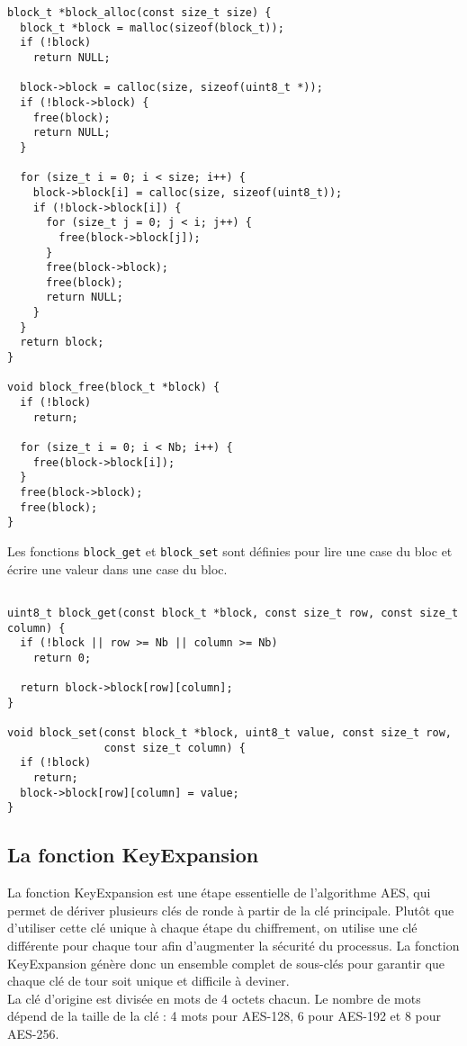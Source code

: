 \documentclass[a4paper, 10pt]{article}
\begin{document}
  \small{
  \begin{verbatim}  
block_t *block_alloc(const size_t size) {
  block_t *block = malloc(sizeof(block_t));
  if (!block)
    return NULL;

  block->block = calloc(size, sizeof(uint8_t *));
  if (!block->block) {
    free(block);
    return NULL;
  }

  for (size_t i = 0; i < size; i++) {
    block->block[i] = calloc(size, sizeof(uint8_t));
    if (!block->block[i]) {
      for (size_t j = 0; j < i; j++) {
        free(block->block[j]);
      }
      free(block->block);
      free(block);
      return NULL;
    }
  }
  return block;
}

void block_free(block_t *block) {
  if (!block)
    return;

  for (size_t i = 0; i < Nb; i++) {
    free(block->block[i]);
  }
  free(block->block);
  free(block);
}
\end{verbatim}
}
\normalsize
Les fonctions \texttt{block\_get} et \texttt{block\_set} sont définies pour lire une 
case du bloc et écrire une valeur dans une case du bloc.
\small{
  \begin{verbatim}

uint8_t block_get(const block_t *block, const size_t row, const size_t column) {
  if (!block || row >= Nb || column >= Nb)
    return 0;

  return block->block[row][column];
}

void block_set(const block_t *block, uint8_t value, const size_t row,
               const size_t column) {
  if (!block)
    return;
  block->block[row][column] = value;
}
  \end{verbatim}
}
  \subsection{La fonction KeyExpansion}

  La fonction KeyExpansion est une étape essentielle de l’algorithme AES, qui permet de dériver plusieurs clés de ronde 
   à partir de la clé principale. Plutôt que d’utiliser cette clé 
  unique à chaque étape du chiffrement, on utilise une clé différente pour chaque tour afin 
  d’augmenter la sécurité du processus. La fonction KeyExpansion génère donc un ensemble complet de sous-clés
  pour garantir que chaque clé de tour soit unique et difficile à deviner.\\
  La clé d’origine est divisée en mots de 4 octets chacun. Le nombre de mots dépend de la taille de la clé : 
  4 mots pour AES-128, 6 pour AES-192 et 8 pour AES-256.
\end{document}
